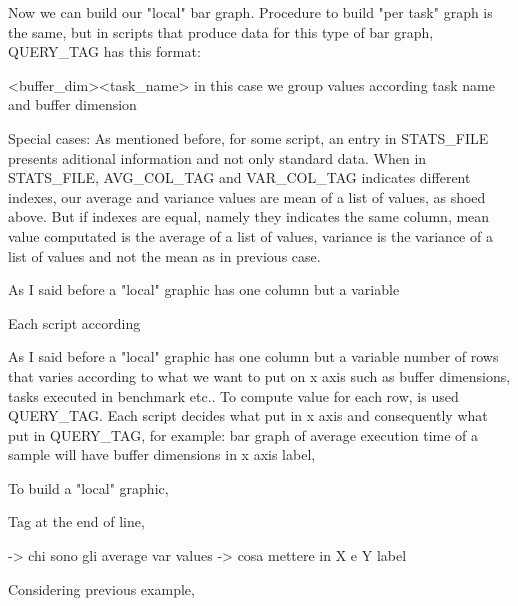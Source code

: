 \documentclass[a4paper,10pt]{article}
\begin{document}
\begin{multicols}{2}
Now we can build our "local" bar graph. Procedure to build
"per task" graph is the same, but in scripts that produce data for this type of bar graph,
QUERY\_TAG has this format: 

<buffer\_dim><task\_name> in this case we group values according task name and buffer dimension

Special cases:
As mentioned before, for some script, an entry in STATS\_FILE presents aditional information 
and not only standard data. 
When in STATS\_FILE, AVG\_COL\_TAG and VAR\_COL\_TAG indicates different indexes, our average
and variance values are mean of a list of values, as shoed above. But if indexes are equal, namely 
they indicates the same column, mean value computated is the average of a list of values, variance
is the variance of a list of values and not the mean as in previous case.














As I said before a "local" graphic has one column but a variable

Each script according 

As I said before a "local" graphic has one column but a variable number of rows that varies 
according to what we want to put on x axis such as buffer dimensions, tasks executed in benchmark etc..
To compute value for each row, is used QUERY\_TAG. Each script decides what put in x axis
and consequently what put in QUERY\_TAG, for example: bar graph of average execution time
of a sample will have buffer dimensions in x axis label,  


To build a "local" graphic, 



Tag at the end of line, 


-> chi sono gli average var values
-> cosa mettere in X e Y label







Considering previous example, 







\end{multicols}
\end{document}

